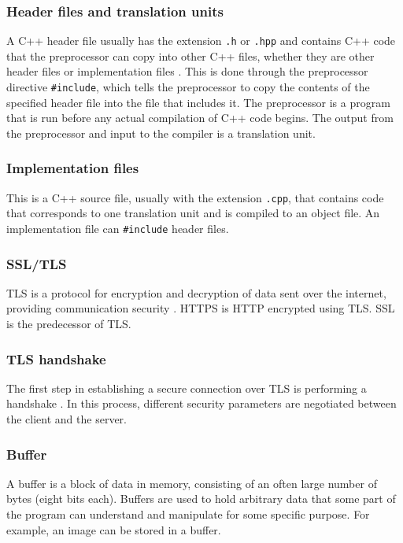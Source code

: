 \documentclass[12pt, a4paper]{article}
\begin{document}
\subsubsection{Header files and translation units}
A C++ header file usually has the extension \texttt{.h} or \texttt{.hpp} and contains C++ code that the preprocessor can copy into other C++ files, whether they are other header files or implementation files \parencite{UnderstandingCompilation}. This is done through the preprocessor directive \texttt{\#include}, which tells the preprocessor to copy the contents of the specified header file into the file that includes it. The preprocessor is a program that is run before any actual compilation of C++ code begins. The output from the preprocessor and input to the compiler is a translation unit.

\subsubsection{Implementation files}
This is a C++ source file, usually with the extension \texttt{.cpp}, that contains code that corresponds to one translation unit and is compiled to an object file. An implementation file can \texttt{\#include} header files.

\subsubsection{SSL/TLS}
TLS is a protocol for encryption and decryption of data sent over the internet, providing communication security \parencite{TlsSpec}. HTTPS is HTTP encrypted using TLS. SSL is the predecessor of TLS.

\subsubsection{TLS handshake}
The first step in establishing a secure connection over TLS is performing a handshake \parencite[][Section 4]{TlsSpec}. In this process, different security parameters are negotiated between the client and the server.

\subsubsection{Buffer}
A buffer is a block of data in memory, consisting of an often large number of bytes (eight bits each). Buffers are used to hold arbitrary data that some part of the program can understand and manipulate for some specific purpose. For example, an image can be stored in a buffer.
\end{document}
